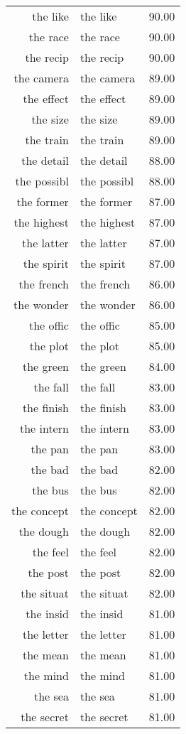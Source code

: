 \begin{table}[ht]
\begin{tabular}{rlr}
  the like & the like & 90.00 \\ 
  the race & the race & 90.00 \\ 
  the recip & the recip & 90.00 \\ 
  the camera & the camera & 89.00 \\ 
  the effect & the effect & 89.00 \\ 
  the size & the size & 89.00 \\ 
  the train & the train & 89.00 \\ 
  the detail & the detail & 88.00 \\ 
  the possibl & the possibl & 88.00 \\ 
  the former & the former & 87.00 \\ 
  the highest & the highest & 87.00 \\ 
  the latter & the latter & 87.00 \\ 
  the spirit & the spirit & 87.00 \\ 
  the french & the french & 86.00 \\ 
  the wonder & the wonder & 86.00 \\ 
  the offic & the offic & 85.00 \\ 
  the plot & the plot & 85.00 \\ 
  the green & the green & 84.00 \\ 
  the fall & the fall & 83.00 \\ 
  the finish & the finish & 83.00 \\ 
  the intern & the intern & 83.00 \\ 
  the pan & the pan & 83.00 \\ 
  the bad & the bad & 82.00 \\ 
  the bus & the bus & 82.00 \\ 
  the concept & the concept & 82.00 \\ 
  the dough & the dough & 82.00 \\ 
  the feel & the feel & 82.00 \\ 
  the post & the post & 82.00 \\ 
  the situat & the situat & 82.00 \\ 
  the insid & the insid & 81.00 \\ 
  the letter & the letter & 81.00 \\ 
  the mean & the mean & 81.00 \\ 
  the mind & the mind & 81.00 \\ 
  the sea & the sea & 81.00 \\ 
  the secret & the secret & 81.00 \\ 

\end{tabular}
\end{table}
